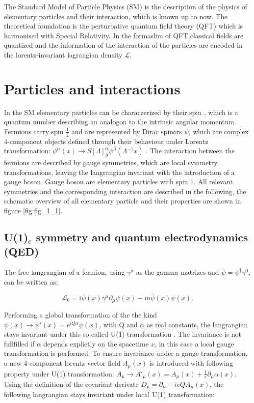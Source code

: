 The Standard Model of Particle Physics (\gls{SM}) \cite{SM} is the description of the physics of elementary particles and their interaction, which is known up to now. The theoretical foundation is the perturbative quantum field theory (\gls{QFT}) which is harmonised with Special Relativity. In the formaslim of \gls{QFT} classical fields are quantized and the information of the interaction of the particles are encoded in the lorentz-invariant lagrangian density $\mathcal{L}$. 



\section{Particles and interactions}
\label{sec:section_1_1}

In the \gls{SM} elementary particles can be characzerized by their spin \cite{SPIN}, which is a quantum number describing an analogon to the intrinsic angular momentum. Fermions carry spin $\frac{1}{2}$ and are represented by Dirac spinors $\psi$, which are complex 4-component objects defined through their behaviour under Lorentz transformation: $\psi^{\alpha}(x) \rightarrow S[\Lambda]^{\alpha}_{\beta} \psi^{\beta}(\Lambda^{-1}x)$ \cite{spinor}. The interaction between the fermions are described by gauge symmetries, which are local symmetry transformations, leaving the langrangian invariant with the introduction of a gauge boson. Gauge boson are elementary particles with spin 1. All relevant symmetries and the corresponding interaction are described in the following, the schematic overview of all elementary particle and their properties are shown in figure \ref{fig:fig_1_1}.

\subsection{U(1)${_e}$ symmetry and quantum electrodynamics (\gls{QED})}
\label{sec:section_1_1_1}

The free langrangian of a fermion, using $\gamma^{\mu}$ as the gamma matrizes and $\bar{\psi} = \psi^{\dagger}\gamma^{0}$, can be written as:

\begin{equation}
	\label{eq:eq_1_1}
	\mathcal{L}_{0} =  i\bar{\psi}(x)\gamma^{\mu}\partial_{\mu}\psi(x) - m\bar{\psi}(x)\psi(x).
\end{equation}

Performing a global transformation of the the kind $\psi(x) \rightarrow \psi'(x) = e^{iQ\alpha}\psi(x)$, with Q and $\alpha$ as real constants, the langrangian stays invariant under this so called U(1) transformation \cite{SM}. The invariance is not fullfilled if $\alpha$ depends explictly on the spacetime $x$, in this case a local gauge transformation is performed. To ensure invariance under a gauge transformation, a new 4-component lorentz vector field $A_{\mu}(x)$ is introduced with following property under U(1) transformation: $A_{\mu} \rightarrow A'_{\mu}(x) = A_{\mu}(x) + \frac{1}{e}\partial_{\mu}\alpha(x)$. Using the definition of the covariant derivate $D_{\mu} = \partial_{\mu} - ieQA_{\mu}(x)$, the following langrangian stays invariant under local U(1) transformation:

